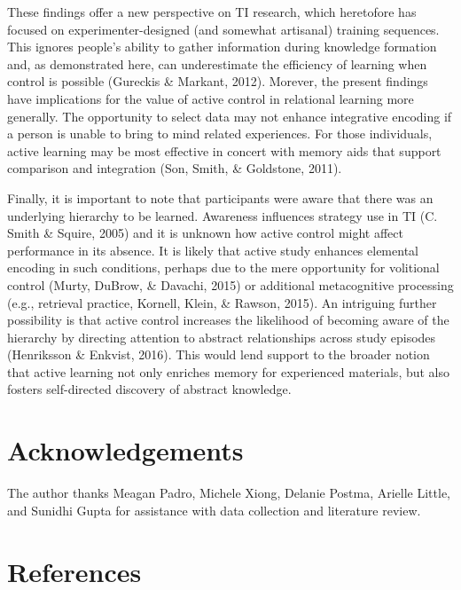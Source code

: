 \documentclass[floatsintext,man]{apa6}
\theoremstyle{definition}
\theoremstyle{definition}
\theoremstyle{definition}
\theoremstyle{remark}
\begin{document}
These findings offer a new perspective on TI research, which heretofore
has focused on experimenter-designed (and somewhat artisanal) training
sequences. This ignores people's ability to gather information during
knowledge formation and, as demonstrated here, can underestimate the
efficiency of learning when control is possible (Gureckis \& Markant,
2012). Morever, the present findings have implications for the value of
active control in relational learning more generally. The opportunity to
select data may not enhance integrative encoding if a person is unable
to bring to mind related experiences. For those individuals, active
learning may be most effective in concert with memory aids that support
comparison and integration (Son, Smith, \& Goldstone, 2011).

Finally, it is important to note that participants were aware that there
was an underlying hierarchy to be learned. Awareness influences strategy
use in TI (C. Smith \& Squire, 2005) and it is unknown how active
control might affect performance in its absence. It is likely that
active study enhances elemental encoding in such conditions, perhaps due
to the mere opportunity for volitional control (Murty, DuBrow, \&
Davachi, 2015) or additional metacognitive processing (e.g., retrieval
practice, Kornell, Klein, \& Rawson, 2015). An intriguing further
possibility is that active control increases the likelihood of becoming
aware of the hierarchy by directing attention to abstract relationships
across study episodes (Henriksson \& Enkvist, 2016). This would lend
support to the broader notion that active learning not only enriches
memory for experienced materials, but also fosters self-directed
discovery of abstract knowledge.

\section{Acknowledgements}\label{acknowledgements}

The author thanks Meagan Padro, Michele Xiong, Delanie Postma, Arielle
Little, and Sunidhi Gupta for assistance with data collection and
literature review.

\newpage

\section{References}\label{references}

\begingroup
\setlength{\parindent}{-0.5in} \setlength{\leftskip}{0.5in}
\end{document}
